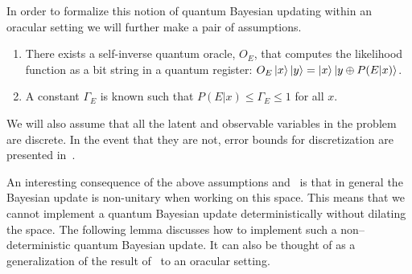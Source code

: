 \documentclass[aps,amsmath,onecolumn,amssymb]{revtex4}
\begin{document}
In order to formalize this notion of quantum Bayesian updating within an oracular setting we will further make a pair of assumptions.
\begin{enumerate}
\item There exists a self-inverse quantum oracle, $O_E$, that computes the likelihood function as a bit string in a quantum register: $O_E\left|x\right\rangle\left|y\right\rangle = \left|x\right\rangle\left|y\oplus P(E|x)\right\rangle$.
\item A constant $\Gamma_E$ is known such that $P(E|x) \le \Gamma_E \le 1$ for all $x$.
\end{enumerate}
We will also assume that all the latent and observable variables in the problem are discrete.  In the event that they are not, error bounds for discretization are presented in~.


An interesting consequence of the above assumptions and~ is that in general the Bayesian update is non-unitary when working on this space.  This means that we cannot  implement a quantum Bayesian update deterministically without dilating the space.
The following lemma discusses how to implement such a non--deterministic quantum Bayesian update.  It can also be thought of as a generalization of the result of~\cite{LYC14} to an oracular setting.
\end{document}
